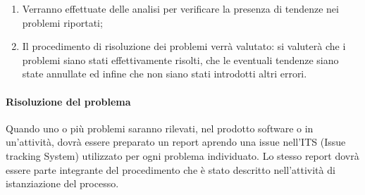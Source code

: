 \begin{enumerate}
				\item Verranno effettuate delle analisi per verificare la presenza di tendenze nei problemi riportati;

				\item Il procedimento di risoluzione dei problemi verrà valutato: si valuterà che i problemi siano stati effettivamente risolti, che le eventuali tendenze siano state annullate ed infine che non siano stati introdotti altri errori.
			\end{enumerate}
		\paragraph{Risoluzione del problema}
			Quando uno o più problemi saranno rilevati, nel prodotto software o in un'attività, dovrà essere preparato un report aprendo una issue nell'ITS (Issue tracking System) utilizzato per ogni problema individuato. Lo stesso report dovrà essere parte integrante del procedimento che è stato descritto nell'attività di istanziazione del processo.

